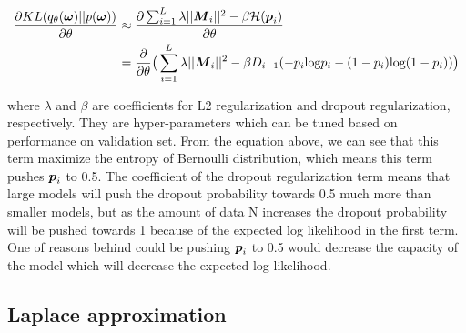 \begin{equation} 
\begin{aligned}\label{KL_grad_concrete}
\frac{\partial KL(q_{\theta}(\boldsymbol \omega)||p(\boldsymbol \omega))}{\partial \theta} 
&\approx \frac{\partial \sum_{i=1}^{L}\lambda||\boldsymbol M_{i}||^{2}- \beta\mathcal H(\boldsymbol p_{i})}{\partial \theta}  \\
&= \frac{\partial}{\partial \theta} \big( \sum_{i=1}^{L}\lambda||\boldsymbol M_{i}||^{2}- \beta D_{i-1}(-p_{i}\text{log}p_{i} - (1-p_{i})\text{log}(1-p_{i}))\big)
\end{aligned}
\end{equation}

where $\lambda$ and $\beta$ are coefficients for L2 regularization and dropout regularization, respectively. They are hyper-parameters which can be tuned based on performance on validation set.
From the equation above, we can see that this term maximize the entropy of Bernoulli distribution, which means this term pushes $\boldsymbol p_i$ to 0.5. The coefficient of the dropout regularization term means that large models will push the dropout probability towards 0.5 much more than smaller models, but as the amount of data N increases the dropout probability will be pushed towards 1 because of the expected log likelihood in the first term. One of reasons behind could be pushing $\boldsymbol p_i$ to 0.5 would decrease the capacity of the model which will decrease the expected log-likelihood. 


\subsection{Laplace approximation}
